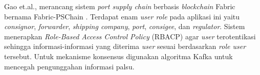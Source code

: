 Gao et.al., merancang sistem \textit{port supply chain} berbasis \textit{blockchain} Fabric bernama Fabric-PSChain \citep{Gao2022}. Terdapat enam \textit{user role} pada aplikasi ini yaitu \textit{consignor}, \textit{forwarder}, \textit{shipping company}, \textit{port}, \textit{consigee}, dan \textit{regulator}. Sistem menerapkan \textit{Role-Based Access Control Policy} (RBACP) agar \textit{user} terotentikasi sehingga informasi-informasi yang diterima \textit{user} sesuai berdasarkan \textit{role user} tersebut. Untuk mekanisme konsensus digunakan algoritma Kafka untuk mencegah pengunggahan informasi palsu.

